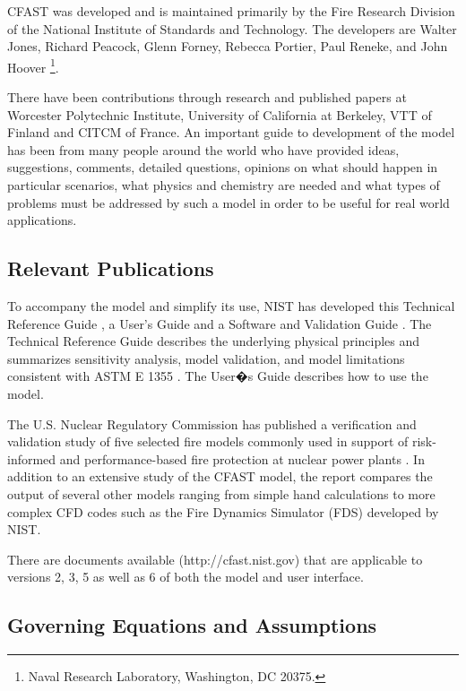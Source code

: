 CFAST was developed and is maintained primarily by the Fire Research Division of the National Institute of Standards and Technology. The developers are Walter Jones, Richard Peacock, Glenn Forney, Rebecca Portier, Paul Reneke, and John Hoover \footnote{Naval Research Laboratory, Washington, DC 20375.}.

There have been contributions through research and published papers at Worcester Polytechnic Institute, University of California at Berkeley, VTT of Finland and CITCM of France. An important guide to development of the model has been from many people around the world who have provided ideas, suggestions, comments, detailed questions, opinions on what should happen in particular scenarios, what physics and chemistry are needed and what types of problems must be addressed by such a model in order to be useful for real world applications.

\subsection{Relevant Publications}

To accompany the model and simplify its use, NIST has developed this Technical Reference Guide \cite{CFAST_Tech_Guide_6}, a User's Guide \cite{CFAST_Users_Guide_6} and a Software and Validation Guide \cite{CFAST_Valid_Guide_6}.  The Technical Reference Guide describes the underlying physical principles and summarizes sensitivity analysis, model validation, and model limitations consistent with ASTM E 1355 \cite{ASTM:E1355}.  The User�s Guide describes how to use the model.

The U.S. Nuclear Regulatory Commission has published a verification and validation study of five selected fire models commonly used in support of risk-informed and performance-based fire protection at nuclear power plants \cite{NRCNUREG1824}. In addition to an extensive study of the CFAST model, the report compares the output of several other models ranging from simple hand calculations to more complex CFD codes such as the Fire Dynamics Simulator (FDS) developed by NIST.

There are documents available (http://cfast.nist.gov) that are applicable to versions 2, 3, 5 as well as 6 of both the model and user interface.

\subsection{Governing Equations and Assumptions}


